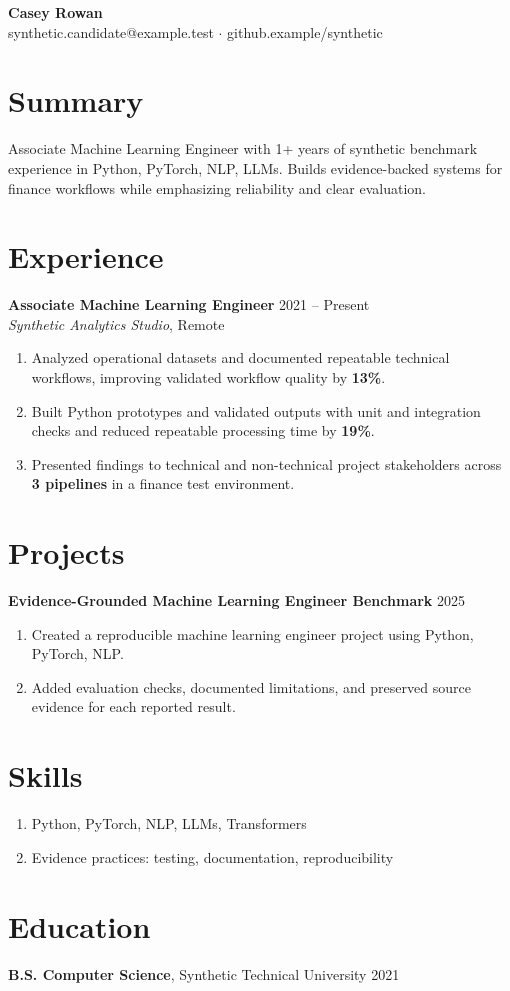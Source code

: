 \documentclass[10pt,letterpaper]{article}
\begin{document}
\begin{center}
{\Large \textbf{Casey Rowan}}\\
synthetic.candidate@example.test $\cdot$ github.example/synthetic
\end{center}

\section*{Summary}
Associate Machine Learning Engineer with 1+ years of synthetic benchmark experience in Python, PyTorch, NLP, LLMs. Builds evidence-backed systems for finance workflows while emphasizing reliability and clear evaluation.

\section*{Experience}
\textbf{Associate Machine Learning Engineer} \hfill 2021 -- Present\\
\textit{Synthetic Analytics Studio}, Remote
\begin{enumerate}
  \item Analyzed operational datasets and documented repeatable technical workflows, improving validated workflow quality by \textbf{13\%}.
  \item Built Python prototypes and validated outputs with unit and integration checks and reduced repeatable processing time by \textbf{19\%}.
  \item Presented findings to technical and non-technical project stakeholders across \textbf{3 pipelines} in a finance test environment.
\end{enumerate}

\section*{Projects}
\textbf{Evidence-Grounded Machine Learning Engineer Benchmark} \hfill 2025
\begin{enumerate}
  \item Created a reproducible machine learning engineer project using Python, PyTorch, NLP.
  \item Added evaluation checks, documented limitations, and preserved source evidence for each reported result.
\end{enumerate}

\section*{Skills}
\begin{enumerate}
  \item Python, PyTorch, NLP, LLMs, Transformers
  \item Evidence practices: testing, documentation, reproducibility
\end{enumerate}

\section*{Education}
\textbf{B.S. Computer Science}, Synthetic Technical University \hfill 2021
\end{document}
